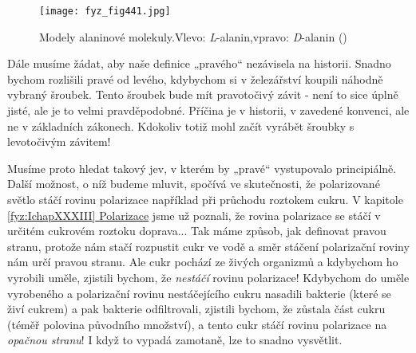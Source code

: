     \begin{figure}[ht!] %
      \centering
      \texttt{[image: fyz\_fig441.jpg]}
      \caption{Modely alaninové molekuly.Vlevo: \emph{L}-alanin,vpravo: \emph{D}-alanin
               (\cite[s.~704]{Feynman01})}
      \label{fyz:fig441}
    \end{figure}

    Dále musíme žádat, aby naše deﬁnice „pravého“ nezávisela na historii. Snadno bychom rozlišili
    pravé od levého, kdybychom si v železářství koupili náhodně vybraný šroubek. Tento šroubek bude
    mít pravotočivý závit - není to sice úplně jisté, ale je to velmi pravděpodobné. Příčina je v
    historii, v zavedené konvenci, ale ne v základních zákonech. Kdokoliv totiž mohl začít vyrábět
    šroubky s levotočivým závitem! 

    Musíme proto hledat takový jev, v kterém by „pravé“ vystupovalo principiálně. Další možnost, o
    níž budeme mluvit, spočívá ve skutečnosti, že polarizované světlo stáčí rovinu polarizace
    například při průchodu roztokem cukru. V kapitole
    \hyperref[fyz:IchapXXXIII]{\ref{fyz:IchapXXXIII} {Polarizace}} jsme už poznali, že rovina
    polarizace se stáčí v určitém cukrovém roztoku doprava... Tak máme způsob, jak definovat pravou
    stranu, protože nám stačí rozpustit cukr ve vodě a směr stáčení polarizační roviny nám určí
    pravou stranu. Ale cukr pochází ze živých organizmů a kdybychom ho vyrobili uměle, zjistili
    bychom, že \emph{nestáčí} rovinu polarizace! Kdybychom do uměle vyrobeného a polarizační rovinu
    nestáčejícího cukru nasadili bakterie (které se živí cukrem) a pak bakterie odﬁltrovali,
    zjistili bychom, že zůstala část cukru (téměř polovina původního množství), a tento cukr stáčí
    rovinu polarizace na \emph{opačnou stranu}! I když to vypadá zamotaně, lze to snadno vysvětlit.

